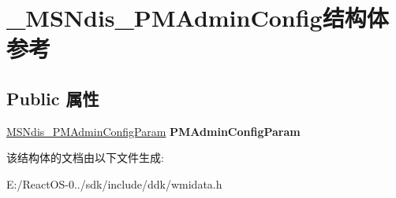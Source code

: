 \hypertarget{struct___m_s_ndis___p_m_admin_config}{}\section{\+\_\+\+M\+S\+Ndis\+\_\+\+P\+M\+Admin\+Config结构体 参考}
\label{struct___m_s_ndis___p_m_admin_config}
\subsection*{Public 属性}
\begin{DoxyCompactItemize}
\item 
\mbox{\label{struct___m_s_ndis___p_m_admin_config_aa5f5e73fb65878e1b68223914ff93333}} 
\hyperlink{struct___m_s_ndis___p_m_admin_config_param}{M\+S\+Ndis\+\_\+\+P\+M\+Admin\+Config\+Param} {\bfseries P\+M\+Admin\+Config\+Param}
\end{DoxyCompactItemize}


该结构体的文档由以下文件生成\+:\begin{DoxyCompactItemize}
\item 
E\+:/\+React\+O\+S-\/0../sdk/include/ddk/wmidata.\+h\end{DoxyCompactItemize}
